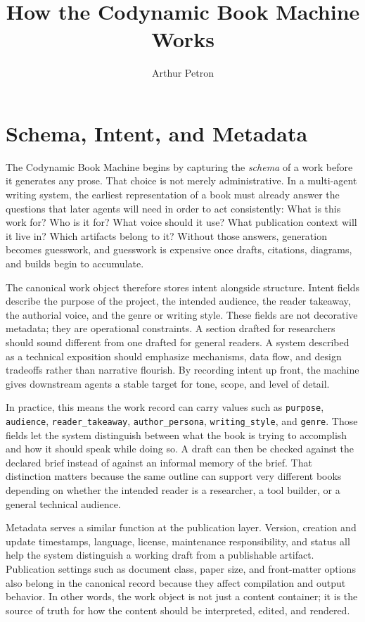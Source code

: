 \documentclass[11pt]{article}
\title{How the Codynamic Book Machine Works}
\author{Arthur Petron}
\begin{document}
\section*{Schema, Intent, and Metadata}

The Codynamic Book Machine begins by capturing the \emph{schema} of a work before it generates any prose. That choice is not merely administrative. In a multi-agent writing system, the earliest representation of a book must already answer the questions that later agents will need in order to act consistently: What is this work for? Who is it for? What voice should it use? What publication context will it live in? Which artifacts belong to it? Without those answers, generation becomes guesswork, and guesswork is expensive once drafts, citations, diagrams, and builds begin to accumulate.

The canonical work object therefore stores intent alongside structure. Intent fields describe the purpose of the project, the intended audience, the reader takeaway, the authorial voice, and the genre or writing style. These fields are not decorative metadata; they are operational constraints. A section drafted for researchers should sound different from one drafted for general readers. A system described as a technical exposition should emphasize mechanisms, data flow, and design tradeoffs rather than narrative flourish. By recording intent up front, the machine gives downstream agents a stable target for tone, scope, and level of detail.

In practice, this means the work record can carry values such as \texttt{purpose}, \texttt{audience}, \texttt{reader\_takeaway}, \texttt{author\_persona}, \texttt{writing\_style}, and \texttt{genre}. Those fields let the system distinguish between what the book is trying to accomplish and how it should speak while doing so. A draft can then be checked against the declared brief instead of against an informal memory of the brief. That distinction matters because the same outline can support very different books depending on whether the intended reader is a researcher, a tool builder, or a general technical audience.

Metadata serves a similar function at the publication layer. Version, creation and update timestamps, language, license, maintenance responsibility, and status all help the system distinguish a working draft from a publishable artifact. Publication settings such as document class, paper size, and front-matter options also belong in the canonical record because they affect compilation and output behavior. In other words, the work object is not just a content container; it is the source of truth for how the content should be interpreted, edited, and rendered.
\end{document}

